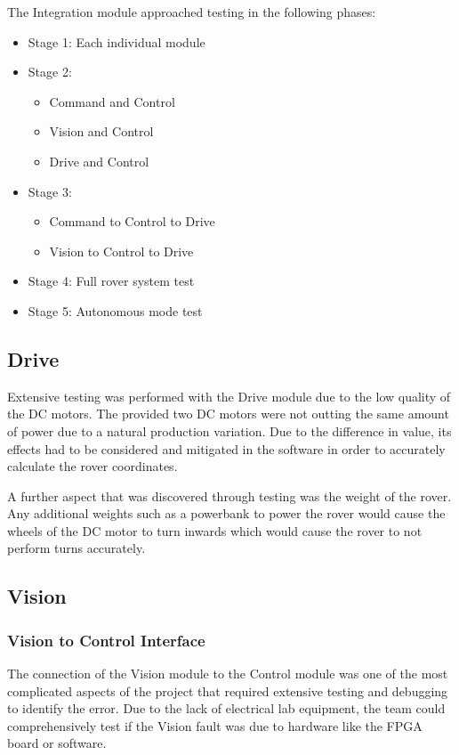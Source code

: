 \documentclass[11pt, a4paper]{article}
\begin{document}
The Integration module approached testing in the following phases: 
\begin{itemize}
    \item Stage 1: Each individual module 
    \item Stage 2:
    \begin{itemize}
        \item Command and Control 
        \item Vision and Control 
        \item Drive and Control
    \end{itemize}
    \item Stage 3: 
    \begin{itemize}
        \item Command to Control to Drive 
        \item Vision to Control to Drive
    \end{itemize}
    \item Stage 4: Full rover system test 
    \item Stage 5: Autonomous mode test 
\end{itemize}

\subsection{Drive}

Extensive testing was performed with the Drive module due to the low quality of the DC motors. The provided two DC motors were not outting the same amount of power due to a natural production variation. Due to the difference in value, its effects had to be considered and mitigated in the software in order to accurately calculate the rover coordinates. 

A further aspect that was discovered through testing was the weight of the rover. Any additional weights such as a powerbank to power the rover would cause the wheels of the DC motor to turn inwards which would cause the rover to not perform turns accurately. 

\subsection{Vision}
\subsubsection{Vision to Control Interface}
The connection of the Vision module to the Control module was one of the most complicated aspects of the project that required extensive testing and debugging to identify the error. Due to the lack of electrical lab equipment, the team could comprehensively test if the Vision fault was due to hardware like the FPGA board or software. 
\end{document}
